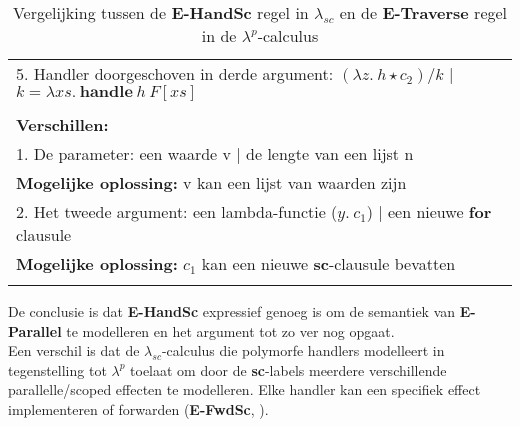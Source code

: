 \begin{table}[h]
\begin{tabular}{|l|}
        5. Handler doorgeschoven in derde argument: $(\lambda z. \ h \star c_2) / k$ | $k = \lambda xs. \ \textbf{handle} \ h \ F[xs]$ \\
        \\
        \textbf{Verschillen:}\\
        1. De parameter: een waarde v | de lengte van een lijst n\\
        \textbf{Mogelijke oplossing:} v kan een lijst van waarden zijn \\
        2. Het tweede argument: een lambda-functie ($y. \ c_1$) | een nieuwe \textbf{for} clausule \\
        \textbf{Mogelijke oplossing:} $c_1$ kan een nieuwe \textbf{sc}-clausule bevatten \\
        \\
        \hline
    \end{tabular}
    \caption{Vergelijking tussen de \textbf{E-HandSc} regel in $\lambda_{sc}$ en de \textbf{E-Traverse} regel in de $\lambda^p$-calculus}
    \label{tab:semHandTraverse}
\end{table}
De conclusie is dat \textbf{E-HandSc} expressief genoeg is om de semantiek van \textbf{E-Parallel} te modelleren en het argument tot zo ver nog opgaat. \\
Een verschil is dat de $\lambda_{sc}$-calculus die polymorfe handlers modelleert in tegenstelling tot $\lambda^p$ toelaat om door de \textbf{sc}-labels meerdere verschillende parallelle/scoped effecten te modelleren. Elke handler kan een specifiek effect implementeren of forwarden (\textbf{E-FwdSc}, ). 


